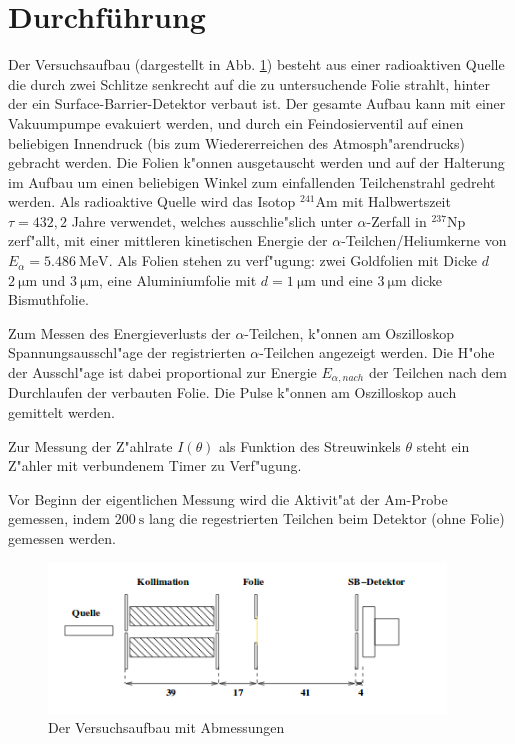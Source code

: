 \section{Durchführung}
  \label{sec:Durchführung}
  Der Versuchsaufbau (dargestellt in Abb. \ref{fig:aufbau}) besteht aus einer radioaktiven Quelle die durch zwei Schlitze senkrecht auf die zu untersuchende Folie strahlt, hinter der ein Surface-Barrier-Detektor verbaut ist.
  Der gesamte Aufbau kann mit einer Vakuumpumpe evakuiert werden, und durch ein Feindosierventil auf einen beliebigen Innendruck (bis zum Wiedererreichen des Atmosph"arendrucks) gebracht werden.
  Die Folien k"onnen ausgetauscht werden und auf der Halterung im Aufbau um einen beliebigen Winkel zum einfallenden Teilchenstrahl gedreht werden.
  Als radioaktive Quelle wird das Isotop $^{241}\text{Am}$ mit Halbwertszeit $\tau=432,2$ Jahre verwendet, welches ausschlie"slich unter $\alpha$-Zerfall in $^{237}\text{Np}$ zerf"allt, mit einer mittleren kinetischen Energie der $\alpha$-Teilchen/Heliumkerne von $E_{\alpha}=\SI{5,486}{\mega \electronvolt}$.
  Als Folien stehen zu verf"ugung: zwei Goldfolien mit Dicke $d$ $\SI{2}{\micro \meter}$ und $\SI{3}{\micro \meter}$, eine Aluminiumfolie mit $d=\SI{1}{\micro \meter}$ und eine $\SI{3}{\micro \meter}$ dicke Bismuthfolie.

  Zum Messen des Energieverlusts der $\alpha$-Teilchen, k"onnen am Oszilloskop Spannungsausschl"age der registrierten  $\alpha$-Teilchen angezeigt werden. Die H"ohe der Ausschl"age ist dabei proportional zur Energie $E_{\alpha,nach}$ der Teilchen nach dem Durchlaufen der verbauten Folie.
  Die Pulse k"onnen am Oszilloskop auch gemittelt werden.

  Zur Messung der Z"ahlrate $I(\theta)$ als Funktion des Streuwinkels $\theta$ steht ein Z"ahler mit verbundenem Timer zu Verf"ugung.

  Vor Beginn der eigentlichen Messung wird die Aktivit"at der Am-Probe gemessen, indem $\SI{200}{\second}$ lang die regestrierten Teilchen beim Detektor (ohne Folie) gemessen werden.

  \begin{figure}
    \centering
    \includegraphics[height=4cm]{bilder/aufbau.png}
    \caption{Der Versuchsaufbau mit Abmessungen \cite{Anleitung}}
    \label{fig:aufbau}
  \end{figure}



